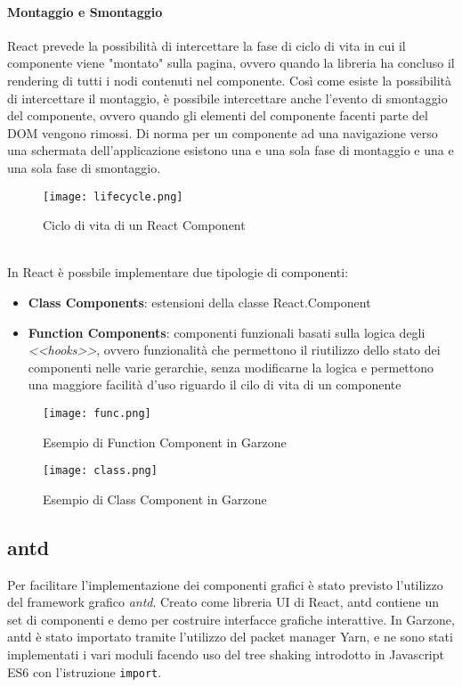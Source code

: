 \paragraph{Montaggio e Smontaggio} React prevede la possibilità di intercettare la fase di ciclo di vita in cui il componente viene "montato" sulla pagina, ovvero quando la libreria ha concluso il rendering di tutti i nodi contenuti nel componente. Così come esiste la possibilità di intercettare il montaggio, è possibile intercettare anche l'evento di smontaggio del componente, ovvero quando gli elementi del componente facenti parte del DOM vengono rimossi. Di norma per un componente ad una navigazione verso una schermata dell'applicazione esistono una e una sola fase di montaggio e una e una sola fase di smontaggio.
\begin{figure}[!htb]
    \centering
    \texttt{[image: lifecycle.png]}
    \caption{Ciclo di vita di un React Component\cite{LIFE}}
\end{figure}
\\[12pt]
In React è possbile implementare due tipologie di componenti:
\begin{itemize}
    \item \textbf{Class Components}: estensioni della classe React.Component
    \item \textbf{Function Components}: componenti funzionali basati sulla logica degli \textit{<<hooks>>}, ovvero funzionalità che permettono il riutilizzo dello stato dei componenti nelle varie gerarchie, senza modificarne la logica e permettono una maggiore facilità d'uso riguardo il cilo di vita di un componente
\end{itemize} 
\begin{figure}[!htb]
    \centering
    \texttt{[image: func.png]}
    \caption{Esempio di Function Component in Garzone}
\end{figure}
\begin{figure}[!htb]
    \centering
    \texttt{[image: class.png]}
    \caption{Esempio di Class Component in Garzone}
\end{figure}
\subsection{antd}
Per facilitare l'implementazione dei componenti grafici è stato previsto l'utilizzo del framework grafico \textit{antd}. Creato come libreria UI di React, antd contiene un set di componenti e demo per costruire interfacce grafiche interattive\cite{ANTD}. In Garzone, antd è stato importato tramite l'utilizzo del packet manager Yarn, e ne sono stati implementati i vari moduli facendo uso del tree shaking introdotto in Javascript ES6 con l'istruzione \lstinline[basicstyle=\ttfamily]!import!.
